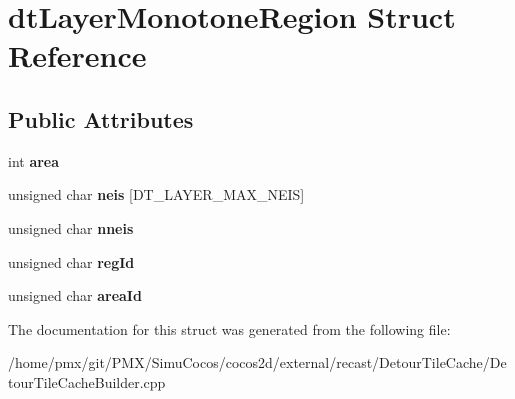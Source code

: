 \hypertarget{structdtLayerMonotoneRegion}{}\section{dt\+Layer\+Monotone\+Region Struct Reference}
\label{structdtLayerMonotoneRegion}
\subsection*{Public Attributes}
\begin{DoxyCompactItemize}
\item 
\mbox{\label{structdtLayerMonotoneRegion_a1ac6f67259d70c25d55f1c0fc05077bf}} 
int {\bfseries area}
\item 
\mbox{\label{structdtLayerMonotoneRegion_a01cc26ceb4d0aa1dbb8712705c8d34cc}} 
unsigned char {\bfseries neis} \mbox{[}D\+T\+\_\+\+L\+A\+Y\+E\+R\+\_\+\+M\+A\+X\+\_\+\+N\+E\+IS\mbox{]}
\item 
\mbox{\label{structdtLayerMonotoneRegion_a60988af0dcb5582f1017506fc01d19c6}} 
unsigned char {\bfseries nneis}
\item 
\mbox{\label{structdtLayerMonotoneRegion_a1f4d98055db146d7bd28129b1f5741cd}} 
unsigned char {\bfseries reg\+Id}
\item 
\mbox{\label{structdtLayerMonotoneRegion_a9e0572100cbcf847291716b3b1008e6d}} 
unsigned char {\bfseries area\+Id}
\end{DoxyCompactItemize}


The documentation for this struct was generated from the following file\+:\begin{DoxyCompactItemize}
\item 
/home/pmx/git/\+P\+M\+X/\+Simu\+Cocos/cocos2d/external/recast/\+Detour\+Tile\+Cache/Detour\+Tile\+Cache\+Builder.\+cpp\end{DoxyCompactItemize}
